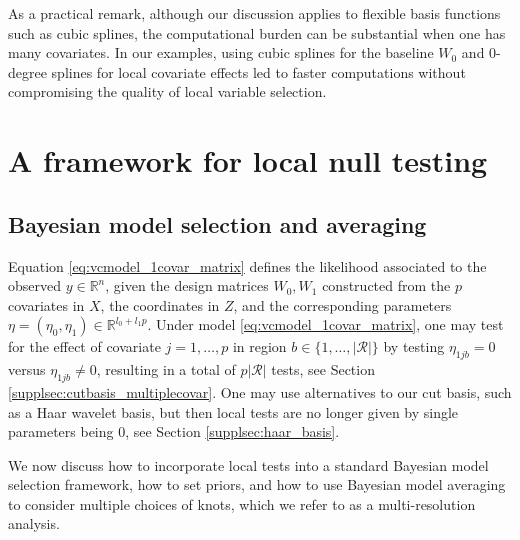 As a practical remark, although our discussion applies to flexible basis functions such as cubic splines, the computational burden can be substantial when one has many covariates. In our examples, using cubic splines for the baseline $W_0$ and 0-degree splines for local covariate effects led to faster computations without compromising the quality of local variable selection. %

\section{A framework for local null testing}
\label{sec:framework}


\subsection{Bayesian model selection and averaging}
\label{ssec:bms}

Equation \eqref{eq:vcmodel_1covar_matrix} defines the likelihood associated to the observed $y \in \mathbb{R}^n$, given the design matrices $W_0,W_1$ constructed from the $p$ covariates in $X$, the coordinates in $Z$, and the corresponding parameters $\eta=(\eta_0,\eta_1) \in \mathbb{R}^{l_0+l_1 p}$.
Under model \eqref{eq:vcmodel_1covar_matrix}, one may test for the effect of covariate $j=1,\ldots,p$ in region $b \in \{1,\ldots,|\mathcal{R}|\}$ by testing $\eta_{1jb}=0$ versus $\eta_{1jb} \neq 0$, resulting in a total of $p |\mathcal{R}|$ tests, see Section \ref{supplsec:cutbasis_multiplecovar}.
 One may use alternatives to our cut basis, such as a Haar wavelet basis, but then local tests are no longer given by single parameters being 0, see Section \ref{supplsec:haar_basis}. 

We now discuss how to incorporate local tests into a standard Bayesian model selection framework,
how to set priors, and how to use Bayesian model averaging to consider multiple choices of knots, which we refer to as a multi-resolution analysis.




